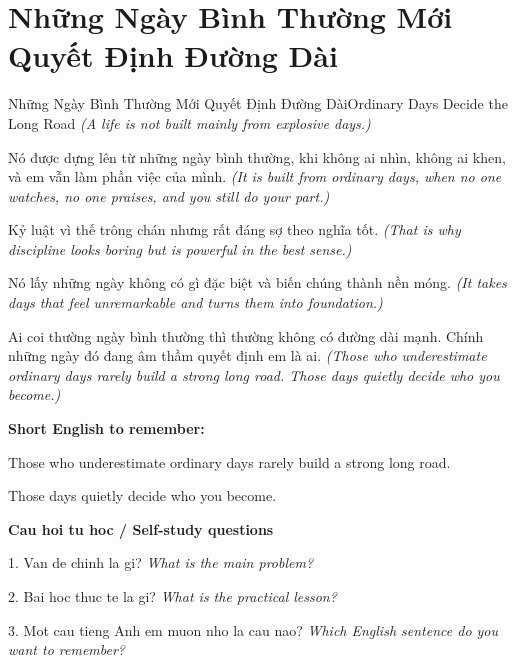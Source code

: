 \section{Những Ngày Bình Thường Mới Quyết Định Đường Dài}
\begin{truyen}{Những Ngày Bình Thường Mới Quyết Định Đường Dài}{Ordinary Days Decide the Long Road}
\textit{(A life is not built mainly from explosive days.)}

Nó được dựng lên từ những ngày bình thường, khi không ai nhìn, không ai khen, và em vẫn làm phần việc của mình.
\textit{(It is built from ordinary days, when no one watches, no one praises, and you still do your part.)}

Kỷ luật vì thế trông chán nhưng rất đáng sợ theo nghĩa tốt.
\textit{(That is why discipline looks boring but is powerful in the best sense.)}

Nó lấy những ngày không có gì đặc biệt và biến chúng thành nền móng.
\textit{(It takes days that feel unremarkable and turns them into foundation.)}

\end{truyen}

\begin{baihoc}
Ai coi thường ngày bình thường thì thường không có đường dài mạnh. Chính những ngày đó đang âm thầm quyết định em là ai.
\textit{(Those who underestimate ordinary days rarely build a strong long road. Those days quietly decide who you become.)}
\end{baihoc}

\begin{ghinhoanh}
\textbf{Short English to remember:}

Those who underestimate ordinary days rarely build a strong long road.

Those days quietly decide who you become.

\end{ghinhoanh}

\begin{tuhocnhanh}
\textbf{Cau hoi tu hoc / Self-study questions}

1. Van de chinh la gi? \textit{What is the main problem?}

2. Bai hoc thuc te la gi? \textit{What is the practical lesson?}

3. Mot cau tieng Anh em muon nho la cau nao? \textit{Which English sentence do you want to remember?}
\end{tuhocnhanh}
\ngancach

